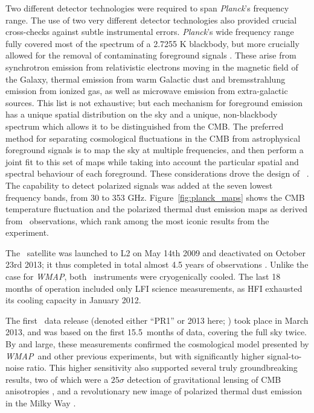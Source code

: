 \documentclass[onecolumn]{aa}
\def\WMAP{\emph{WMAP}}
\begin{document}
Two different detector technologies were required to span
\emph{Planck}'s frequency range.  The use of two very different
detector technologies also provided crucial cross-checks against
subtle instrumental errors. \emph{Planck}'s wide frequency range fully
covered most of the spectrum of a 2.7255 K blackbody, but more
crucially allowed for the removal of contaminating foreground signals
\citep[e.g.,][]{leach2008}.  These arise from synchrotron emission
from relativistic electrons moving in the magnetic field of the
Galaxy, thermal emission from warm Galactic dust and bremsstrahlung
emission from ionized gas, as well as microwave emission from
extra-galactic sources.  This list is not exhaustive; but each
mechanism for foreground emission has a unique spatial distribution on
the sky and a unique, non-blackbody spectrum which allows it to be
distinguished from the CMB.  The preferred method for separating
cosmological fluctuations in the CMB from astrophysical foreground
signals is to map the sky at multiple frequencies, and then perform a
joint fit to this set of maps while taking into account the particular
spatial and spectral behaviour of each foreground.  These
considerations drove the design of
\Planck\ \citep{planck2005-bluebook}.  The capability to detect
polarized signals was added at the seven lowest frequency bands, from
30 to 353 GHz. Figure~\ref{fig:planck_maps} shows the CMB temperature
fluctuation and the polarized thermal dust emission maps as derived
from \Planck\ observations, which rank among the most iconic results
from the experiment.

The \Planck\ satellite was launched to L2 on May 14th 2009 and
deactivated on October 23rd 2013; it thus completed in total almost
4.5 years of observations \citep{planck2016-l01}. Unlike the case for
\WMAP, both \Planck\ instruments were cryogenically cooled. The last
18 months of operation included only LFI science measurements, as HFI
exhausted its cooling capacity in January 2012.

The first \Planck\ data release (denoted either ``PR1'' or 2013 here;
\citealp{planck2013-p01}) took place in March 2013, and was based on
the first 15.5~months of data, covering the full sky twice. By and
large, these measurements confirmed the cosmological model presented
by \WMAP\ and other previous experiments, but with significantly
higher signal-to-noise ratio. This higher sensitivity also supported
several truly groundbreaking results, two of which were a $25\sigma$
detection of gravitational lensing of CMB anisotropies
\citep{planck2013-p12}, and a revolutionary new image of polarized
thermal dust emission in the Milky Way \citep{planck2013-p06b}.
\end{document}
